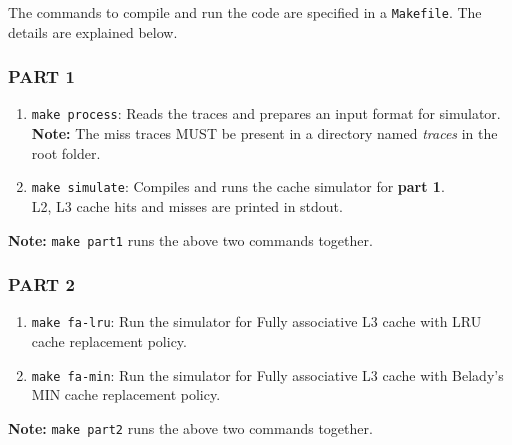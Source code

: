 
    The commands to compile and run the code are specified in a \texttt{Makefile}. The details are 
    explained below.

\subsubsection{PART 1}
\begin{enumerate}
\item \texttt{make process}: Reads the traces and prepares an input format for simulator. 
\textbf{Note:} The miss traces MUST be present in a directory named \textit{traces} in the root
folder.

\item \texttt{make simulate}: Compiles and runs the cache simulator for \textbf{part 1}.\\L2, L3
cache hits and misses are printed in stdout.
\end{enumerate}

\textbf{Note:} \texttt{make part1} runs the above two commands together.

\subsubsection{PART 2}
\begin{enumerate}
\item \texttt{make fa-lru}: Run the simulator for Fully associative L3 cache with LRU cache
replacement policy.

\item \texttt{make fa-min}: Run the simulator for Fully associative L3 cache with Belady's MIN
cache replacement policy.
\end{enumerate}

\textbf{Note:} \texttt{make part2} runs the above two commands together.


